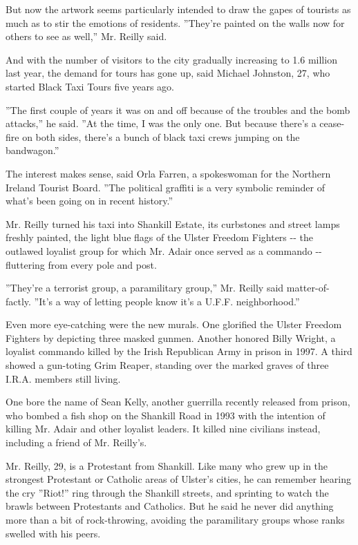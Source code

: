 But now the artwork seems particularly intended to draw the gapes of
tourists as much as to stir the emotions of residents. ''They're painted
on the walls now for others to see as well,'' Mr. Reilly said.

And with the number of visitors to the city gradually increasing to 1.6
million last year, the demand for tours has gone up, said Michael
Johnston, 27, who started Black Taxi Tours five years ago.

''The first couple of years it was on and off because of the troubles
and the bomb attacks,'' he said. ''At the time, I was the only one. But
because there's a cease-fire on both sides, there's a bunch of black
taxi crews jumping on the bandwagon.''

The interest makes sense, said Orla Farren, a spokeswoman for the
Northern Ireland Tourist Board. ''The political graffiti is a very
symbolic reminder of what's been going on in recent history.''

Mr. Reilly turned his taxi into Shankill Estate, its curbstones and
street lamps freshly painted, the light blue flags of the Ulster Freedom
Fighters -\/- the outlawed loyalist group for which Mr. Adair once
served as a commando -\/- fluttering from every pole and post.

''They're a terrorist group, a paramilitary group,'' Mr. Reilly said
matter-of-factly. ''It's a way of letting people know it's a U.F.F.
neighborhood.''

Even more eye-catching were the new murals. One glorified the Ulster
Freedom Fighters by depicting three masked gunmen. Another honored Billy
Wright, a loyalist commando killed by the Irish Republican Army in
prison in 1997. A third showed a gun-toting Grim Reaper, standing over
the marked graves of three I.R.A. members still living.

One bore the name of Sean Kelly, another guerrilla recently released
from prison, who bombed a fish shop on the Shankill Road in 1993 with
the intention of killing Mr. Adair and other loyalist leaders. It killed
nine civilians instead, including a friend of Mr. Reilly's.

Mr. Reilly, 29, is a Protestant from Shankill. Like many who grew up in
the strongest Protestant or Catholic areas of Ulster's cities, he can
remember hearing the cry ''Riot!'' ring through the Shankill streets,
and sprinting to watch the brawls between Protestants and Catholics. But
he said he never did anything more than a bit of rock-throwing, avoiding
the paramilitary groups whose ranks swelled with his peers.

